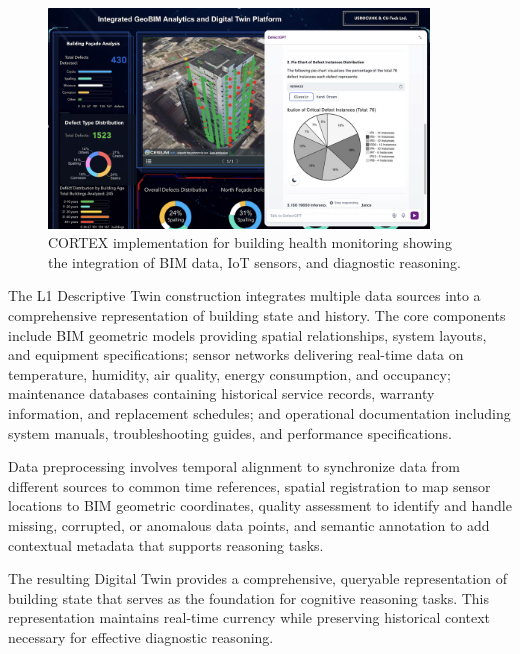 \begin{figure}[htbp]
\centering
\includegraphics[width=0.9\textwidth]{figures/DefectGPT/System_implement.png}
\caption{CORTEX implementation for building health monitoring showing the integration of BIM data, IoT sensors, and diagnostic reasoning.}
\label{fig:system_implementation}
\end{figure}

The L1 Descriptive Twin construction integrates multiple data sources into a comprehensive representation of building state and history. The core components include BIM geometric models providing spatial relationships, system layouts, and equipment specifications; sensor networks delivering real-time data on temperature, humidity, air quality, energy consumption, and occupancy; maintenance databases containing historical service records, warranty information, and replacement schedules; and operational documentation including system manuals, troubleshooting guides, and performance specifications.

Data preprocessing involves temporal alignment to synchronize data from different sources to common time references, spatial registration to map sensor locations to BIM geometric coordinates, quality assessment to identify and handle missing, corrupted, or anomalous data points, and semantic annotation to add contextual metadata that supports reasoning tasks.

The resulting Digital Twin provides a comprehensive, queryable representation of building state that serves as the foundation for cognitive reasoning tasks. This representation maintains real-time currency while preserving historical context necessary for effective diagnostic reasoning.

